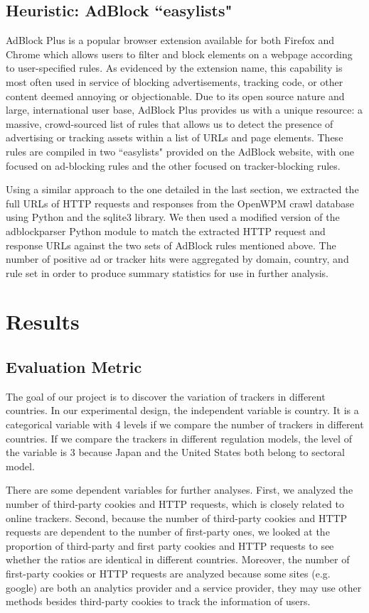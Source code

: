 \documentclass[12pt,draft,onecolumn]{IEEEtran}
\begin{document}
\subsection{Heuristic: AdBlock ``easylists"}

AdBlock Plus \cite{adblock} is a popular browser extension available for both Firefox and Chrome which allows users to filter and block elements on a webpage according to user-specified rules. As evidenced by the extension name, this capability is most often used in service of blocking advertisements, tracking code, or other content deemed annoying or objectionable. Due to its open source nature and large, international user base, AdBlock Plus provides us with a unique resource: a massive, crowd-sourced list of rules that allows us to detect the presence of advertising or tracking assets within a list of URLs and page elements. These rules are compiled in two ``easylists" \cite{easylist} provided on the AdBlock website, with one focused on ad-blocking rules and the other focused on tracker-blocking rules.

Using a similar approach to the one detailed in the last section, we extracted the full URLs of HTTP requests and responses from the OpenWPM crawl database using Python and the sqlite3 library. We then used a modified version of the adblockparser Python module to match the extracted HTTP request and response URLs against the two sets of AdBlock rules mentioned above. The number of positive ad or tracker hits were aggregated by domain, country, and rule set in order to produce summary statistics for use in further analysis.

\section{Results}
\subsection{Evaluation Metric}
The goal of our project is to discover the variation of trackers in different countries.  In our experimental design, the independent variable is country. It is a categorical variable with 4 levels if we compare the number of trackers in different countries. If we compare the trackers in different regulation models, the level of the variable is 3 because Japan and the United States both belong to sectoral model. 

There are some dependent variables for further analyses. First, we analyzed the number of third-party cookies and HTTP requests, which is closely related to online trackers. Second, because the number of third-party cookies and HTTP requests are dependent to the number of first-party ones, we looked at the proportion of third-party and first party cookies and HTTP requests to see whether the ratios are identical in different countries. Moreover, the number of first-party cookies or HTTP requests are analyzed because some sites (e.g. google) are both an analytics provider and a service provider, they may use other methods besides third-party cookies to track the information of users. 
\end{document}

